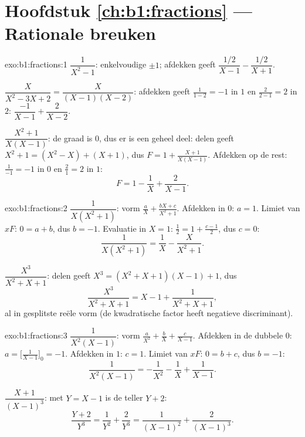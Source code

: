 \section*{Hoofdstuk \ref{ch:b1:fractions} --- Rationale breuken}

\begin{solution}{exo:b1:fractions:1}
$\dfrac{1}{X^2 - 1}$: enkelvoudige  $\pm 1$; afdekken geeft
$\dfrac{1/2}{X-1} - \dfrac{1/2}{X+1}$.

$\dfrac{X}{X^2 - 3X + 2} = \dfrac{X}{(X-1)(X-2)}$: afdekken geeft
$\frac{1}{1-2} = -1$ in $1$ en $\frac{2}{2-1} = 2$ in $2$:
$\dfrac{-1}{X-1} + \dfrac{2}{X-2}$.

$\dfrac{X^2+1}{X(X-1)}$: de graad is $0$, dus er is een geheel deel:
delen geeft $X^2 + 1 = (X^2 - X) + (X + 1)$, dus $F = 1 +
\frac{X+1}{X(X-1)}$. Afdekken op de rest: $\frac{1}{-1} = -1$ in $0$ en
$\frac{2}{1} = 2$ in $1$:
\[
F = 1 - \frac{1}{X} + \frac{2}{X-1} .
\]
\end{solution}

\begin{solution}{exo:b1:fractions:2}
$\dfrac{1}{X(X^2+1)}$: vorm $\frac aX + \frac{bX + c}{X^2 + 1}$.
Afdekken in $0$: $a = 1$. Limiet van $xF$: $0 = a + b$, dus $b = -1$.
Evaluatie in $X = 1$: $\frac12 = 1 + \frac{c - 1}{2}$, dus $c = 0$:
\[
\frac{1}{X(X^2+1)} = \frac 1X - \frac{X}{X^2+1} .
\]

$\dfrac{X^3}{X^2+X+1}$: delen geeft $X^3 = (X^2+X+1)(X - 1) + 1$, dus
\[
\frac{X^3}{X^2+X+1} = X - 1 + \frac{1}{X^2 + X + 1} ,
\]
al in gesplitste reële vorm (de kwadratische factor heeft negatieve
discriminant).
\end{solution}

\begin{solution}{exo:b1:fractions:3}
$\dfrac{1}{X^2(X-1)}$: vorm $\frac{a}{X^2} + \frac bX + \frac{c}{X-1}$.
Afdekken in de dubbele  $0$: $a = \bigl[\frac{1}{X-1}\bigr]_{0} =
-1$. Afdekken in $1$: $c = 1$. Limiet van $xF$: $0 = b + c$, dus $b =
-1$:
\[
\frac{1}{X^2(X-1)} = -\frac{1}{X^2} - \frac1X + \frac{1}{X-1} .
\]

$\dfrac{X+1}{(X-1)^3}$: met $Y = X - 1$ is de teller $Y + 2$:
\[
\frac{Y + 2}{Y^3} = \frac{1}{Y^2} + \frac{2}{Y^3}
= \frac{1}{(X-1)^2} + \frac{2}{(X-1)^3} .
\]
\end{solution}


